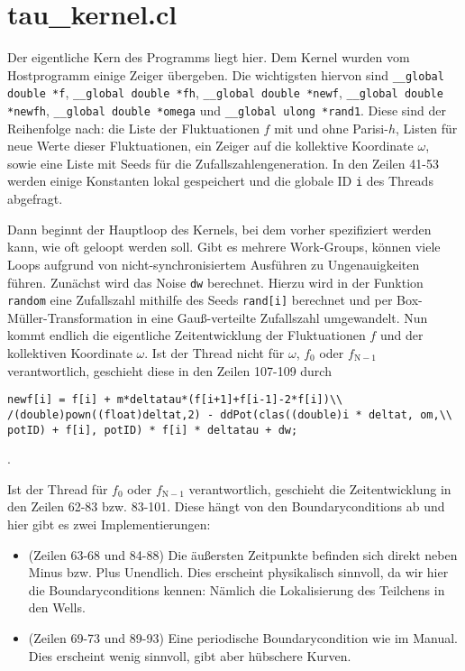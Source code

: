 \documentclass[a4paper,parskip=half,10pt]{scrartcl}
\begin{document}
\section{tau\_kernel.cl}
Der eigentliche Kern des Programms liegt hier. Dem Kernel wurden vom Hostprogramm einige Zeiger übergeben. Die wichtigsten hiervon sind \verb+__global double *f+, \verb+__global double *fh+, \verb+__global double *newf+, \verb+__global double *newfh+,\newline
\verb+__global double *omega+ und \verb+__global ulong *rand1+. Diese sind der Reihenfolge nach: die Liste der Fluktuationen $f$ mit und ohne Parisi-$h$, Listen für neue Werte dieser Fluktuationen, ein Zeiger auf die kollektive Koordinate $\omega$, sowie eine Liste mit Seeds für die Zufallszahlengeneration. In den Zeilen 41-53 werden einige Konstanten lokal gespeichert und die globale ID \verb+i+ des Threads abgefragt.

Dann beginnt der Hauptloop des Kernels, bei dem vorher spezifiziert werden kann, wie oft geloopt werden soll. Gibt es mehrere Work-Groups, können viele Loops aufgrund von nicht-synchronisiertem Ausführen zu Ungenauigkeiten führen. Zunächst wird das Noise \verb+dw+ berechnet. Hierzu wird in der Funktion \verb+random+ eine Zufallszahl mithilfe des Seeds \verb+rand[i]+ berechnet und per Box-Müller-Transformation in eine Gauß-verteilte Zufallszahl umgewandelt. Nun kommt endlich die eigentliche Zeitentwicklung der Fluktuationen $f$ und der kollektiven Koordinate $\omega$. Ist der Thread nicht für $\omega$, $f_{0}$ oder $f_{\mathrm{N-1}}$ verantwortlich, geschieht diese in den Zeilen 107-109 durch
\begin{verbatim}
newf[i] = f[i] + m*deltatau*(f[i+1]+f[i-1]-2*f[i])\\
/(double)pown((float)deltat,2) - ddPot(clas((double)i * deltat, om,\\
potID) + f[i], potID) * f[i] * deltatau + dw;
\end{verbatim}.

Ist der Thread für $f_{0}$ oder $f_{\mathrm{N-1}}$ verantwortlich, geschieht die Zeitentwicklung in den Zeilen 62-83 bzw. 83-101. Diese hängt von den Boundaryconditions ab und hier gibt es zwei Implementierungen:
\begin{itemize}
\item (Zeilen 63-68 und 84-88) Die äußersten Zeitpunkte befinden sich direkt neben Minus bzw. Plus Unendlich. Dies erscheint physikalisch sinnvoll, da wir hier die Boundaryconditions kennen: Nämlich die Lokalisierung des Teilchens in den Wells.
\item (Zeilen 69-73 und 89-93) Eine periodische Boundarycondition wie im Manual. Dies erscheint wenig sinnvoll, gibt aber hübschere Kurven. 
\end{itemize}
\end{document}
